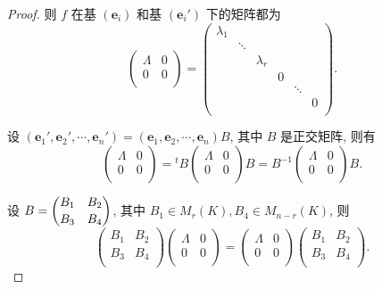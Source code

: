 \documentclass{ctexart}
\begin{document}
\begin{proof}
    则 $f$ 在基 $(\boldsymbol{e}_i)$ 和基 $(\boldsymbol{e}_i')$ 下的矩阵都为
    \[\begin{pmatrix}
        \Lambda & 0 \\
        0 & 0 \\
    \end{pmatrix}=\begin{pmatrix}
        \lambda_1 \\
        & \ddots \\
        && \lambda_r \\
        &&& 0 \\
        &&&& \ddots \\
        &&&&& 0 \\
    \end{pmatrix}.\]
    
    设 $(\boldsymbol{e}_1',\boldsymbol{e}_2',\cdots,\boldsymbol{e}_n')=(\boldsymbol{e}_1,\boldsymbol{e}_2,\cdots,\boldsymbol{e}_n)B$, 其中 $B$ 是正交矩阵, 则有
    \[\begin{pmatrix}
        \Lambda & 0 \\
        0 & 0 \\
    \end{pmatrix}={}^tB\begin{pmatrix}
        \Lambda & 0 \\
        0 & 0 \\
    \end{pmatrix}B=B^{-1}\begin{pmatrix}
        \Lambda & 0 \\
        0 & 0 \\
    \end{pmatrix}B.\]

    设 $B=\dbinom{B_1\quad B_2}{B_3\quad B_4}$, 其中 $B_1\in M_r(K),B_4\in M_{n-r}(K)$, 则
    \[\begin{pmatrix}
        B_1 & B_2 \\
        B_3 & B_4 \\
    \end{pmatrix}\begin{pmatrix}
        \Lambda & 0 \\
        0 & 0 \\
    \end{pmatrix}=\begin{pmatrix}
        \Lambda & 0 \\
        0 & 0 \\
    \end{pmatrix}\begin{pmatrix}
        B_1 & B_2 \\
        B_3 & B_4 \\
    \end{pmatrix}.\]


\end{proof}
\end{document}
